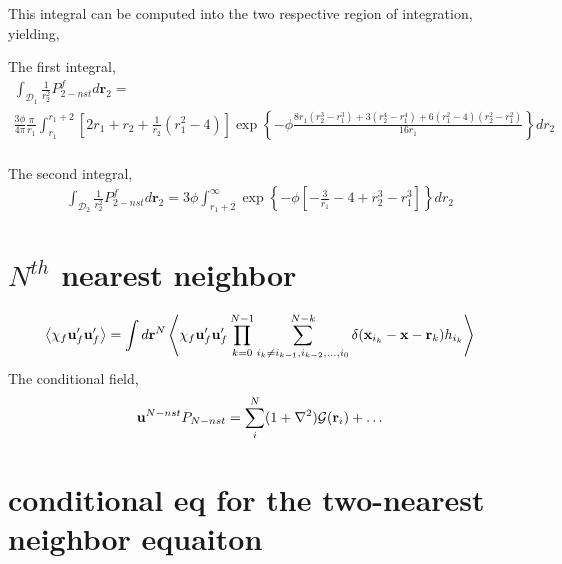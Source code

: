 This integral can be computed into the two respective region of integration, yielding, 

The first integral, 
\begin{multline}
    \int_{
        \mathcal{D}_1 
    }
    \frac{1}{r_2^2}P_{2-nst}^f
    d\textbf{r}_2 
    =\\
    \frac{3 \phi}{4\pi}
    \frac{\pi}{r_1}
    \int_{r_1}^{r_1+2}
    [2r_1
    + 
        r_2
        +     
        \frac{1}{r_2}
        (r_1^2 - 4)]
    \exp\left\{-\phi 
    \frac{ 
    8 r_{1} \left(r_{2}^{3} - r_{1}^{3}\right) 
   + 3 (r_{2}^{4} - r_{1}^{4})
   + 6  \left(r_{1}^{2} - 4 \right) \left(r_{2}^{2} - r_{1}^{2}\right)}{16 r_{1}}
    \right\} 
    dr_2\\
\end{multline}

The second integral, 
\begin{multline}
    \int_{
        \mathcal{D}_2 
    }
    \frac{1}{r_2^2}P_{2-nst}^f
    d\textbf{r}_2 
    =
    3 \phi
    \int_{r_1+2}^{\infty}
    \exp\left\{-\phi 
    \left[
        -\frac{3}{r_1}
        - 4 
        + r_2^3
        -r_1^3
    \right]
    \right\} 
    dr_2 
\end{multline}



\section*{$N^{th}$ nearest neighbor}

\begin{equation}
    \left<
        \chi_f \textbf{u}_f' \textbf{u}_f'
    \right>
    =
    \int d \textbf{r}^N \left<
        \chi_f \textbf{u}_f' \textbf{u}_f'
        \prod_{k=0}^{N-1} \sum_{i_k \neq i_{k-1},i_{k-2},\ldots, i_0}^{N-k}
        \delta(\textbf{x}_{i_k} - \textbf{x} - \textbf{r}_k)
        h_{i_k}
    \right>
\end{equation}
The conditional field, 
\begin{equation}
    \textbf{u}^{N-nst} P_{N-nst}
    = 
    \sum_i^N (1+\mathbf{\nabla}^2) \mathcal{G}(\textbf{r}_i)+\ldots
\end{equation}



\section*{conditional eq for the two-nearest neighbor equaiton}


